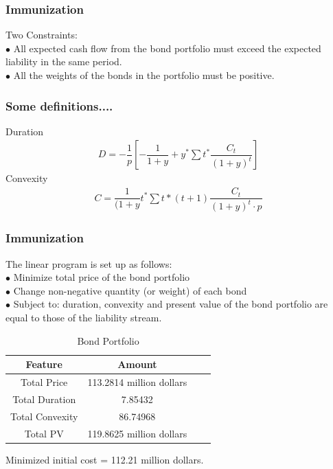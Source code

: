 \documentclass[compress,handout,10pt]{beamer}
\begin{document}
\begin{frame}
\frametitle{Immunization}
Two Constraints: \\
\vspace{5mm}
\noindent $\bullet$ All expected cash flow from the bond portfolio must exceed the expected liability in the same period.\\
\vspace{3mm}
$\bullet$ All the weights of the bonds in the portfolio must be positive.  \\
\end{frame}

\begin{frame}
\frametitle{Some definitions....}
Duration 
\begin{align}
D=-\dfrac {1} {p}\left[-\dfrac {1} {1+y}+y^{\ast }\sum t^{\ast }\dfrac {C_{t}} {\left( 1+y\right) ^{t}}\right]
\end{align}
Convexity
\begin{align}
C=\dfrac {1} {(1+y}t^{\ast }\sum t\ast \left( t+1\right) \dfrac {C_{t}} {\left( 1+y\right) ^{t}\cdot p}
\end{align}
\end{frame}

\begin{frame}
\frametitle{Immunization}
\vspace{8pt}
The linear program is set up as follows:\\
\vspace{5mm}
\noindent $\bullet$ Minimize total price of the bond portfolio\\
\vspace{3mm}
\noindent $\bullet$ Change non-negative quantity (or weight) of each bond\\
\vspace{3mm}
\noindent $\bullet$ Subject to: duration, convexity and present value of the bond portfolio are equal to those of the liability stream.\\
\end{frame}

\begin{frame}
\begin{table}[h]
\centering  
\begin{tabular}{cccc}
\hline
Feature  &Amount\\ \hline  
Total Price  &113.2814 million dollars\\
Total Duration  &7.85432\\ 
Total Convexity  &86.74968\\ 
Total PV  &119.8625 million dollars\\ 
\hline
\end{tabular}
\caption{Bond Portfolio	}
\end{table}
\vspace{4mm}
\centering Minimized initial cost = 112.21 million dollars.\\
\end{frame}
\end{document}
